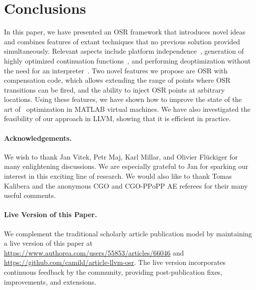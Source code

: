 
\section{Conclusions}
\label{se:conclusions}

In this paper, we have presented an OSR framework that introduces novel ideas and combines features of extant techniques that no previous solution provided simultaneously. Relevant aspects include platform independence~\cite{lameed2013modular}, generation of highly optimized continuation functions~\cite{fink2003design}, and performing deoptimization without the need for an interpreter~\cite{bebenita2010spur}. Two novel features we propose are OSR with compensation code, which allows extending the range of points where OSR transitions can be fired, and the ability to inject OSR points at arbitrary locations. Using these features, we have shown how to improve the state of the art of \feval\ optimization in MATLAB virtual machines. We have also investigated the feasibility of our approach in LLVM, showing that it is efficient in practice.

\paragraph{Acknowledgements.}

We wish to thank Jan Vitek, Petr Maj, Karl Millar, and Olivier Fl{\"u}ckiger for many enlightening discussions. We are especially grateful to Jan for sparking our interest in this exciting line of research. 
We would also like to thank Tomas Kalibera and the anonymous CGO and CGO-PPoPP AE referees for their many useful comments.

\paragraph{Live Version of this Paper.}
We complement the traditional scholarly article publication model by maintaining a live version of this paper at {\small\url{https://www.authorea.com/users/55853/articles/66046}} and {\small\url{https://github.com/camild/article-llvm-osr}}. The live version incorporates continuous feedback by the community, providing post-publication fixes, improvements, and extensions.
